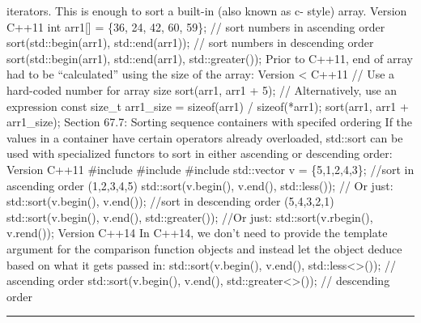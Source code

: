 iterators. This is enough to sort a built-in (also known as c- style)
array. Version C++11 int arr1{[}{]} = \{36, 24, 42, 60, 59\}; // sort
numbers in ascending order sort(std::begin(arr1), std::end(arr1)); //
sort numbers in descending order sort(std::begin(arr1), std::end(arr1),
std::greater()); Prior to C++11, end of array had to be ``calculated''
using the size of the array: Version \textless{} C++11 // Use a
hard-coded number for array size sort(arr1, arr1 + 5); // Alternatively,
use an expression const size\_t arr1\_size = sizeof(arr1) /
sizeof(*arr1); sort(arr1, arr1 + arr1\_size); Section 67.7: Sorting
sequence containers with specifed ordering If the values in a container
have certain operators already overloaded, std::sort can be used with
specialized functors to sort in either ascending or descending order:
Version C++11 \#include \#include \#include std::vector v =
\{5,1,2,4,3\}; //sort in ascending order (1,2,3,4,5)
std::sort(v.begin(), v.end(), std::less()); // Or just:
std::sort(v.begin(), v.end()); //sort in descending order (5,4,3,2,1)
std::sort(v.begin(), v.end(), std::greater()); //Or just:
std::sort(v.rbegin(), v.rend()); Version C++14 In C++14, we don't need
to provide the template argument for the comparison function objects and
instead let the object deduce based on what it gets passed in:
std::sort(v.begin(), v.end(), std::less\textless\textgreater()); //
ascending order std::sort(v.begin(), v.end(),
std::greater\textless\textgreater()); // descending order

\begin{center}\rule{0.5\linewidth}{0.5pt}\end{center}
